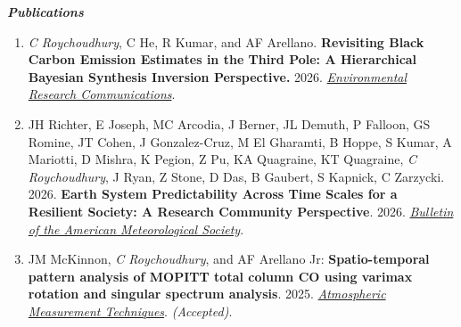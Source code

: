 \documentclass[margin,line]{resume}
\begin{document}
\begin{resume}
		
		
		
		\textbf{\emph{\textcolor{sep}{Publications}}}
		\begin{enumerate}[topsep=1pt, partopsep=1pt, itemsep=0.5pt, parsep=0.1pt, leftmargin=15pt,label=\arabic*.]
			
			\item \textit{C Roychoudhury}, C He, R Kumar, and AF Arellano. \textbf{Revisiting Black Carbon Emission Estimates in the Third Pole: A Hierarchical Bayesian Synthesis Inversion Perspective.} 2026. \textit{\href{https://iopscience.iop.org/article/10.1088/2515-7620/ae4858}{Environmental Research Communications}}.
			
			\item JH Richter, E Joseph, MC Arcodia, J Berner, JL Demuth, P Falloon, GS Romine, JT Cohen, J Gonzalez-Cruz, M El Gharamti, B Hoppe, S Kumar, A Mariotti, D Mishra, K Pegion, Z Pu, KA Quagraine, KT Quagraine, \textit{C Roychoudhury}, J Ryan, Z Stone, D Das, B Gaubert, S Kapnick, C Zarzycki. 2026. \textbf{Earth System Predictability Across Time Scales for a Resilient Society: A Research Community Perspective}. 2026. \emph{\href{https://journals.ametsoc.org/view/journals/bams/aop/BAMS-D-24-0155.1/BAMS-D-24-0155.1.xml}{Bulletin of the American Meteorological Society}}. 
			
			\item JM McKinnon,\textit{ C Roychoudhury}, and AF Arellano Jr: \textbf{Spatio-temporal pattern analysis of MOPITT total column CO using varimax rotation and singular spectrum analysis}. 2025.  \textit{\href{https://doi.org/10.5194/egusphere-2024-3440, 2025}{Atmospheric Measurement Techniques}}. \textit{(Accepted)}.
			

\end{enumerate}
\end{resume}
\end{document}
